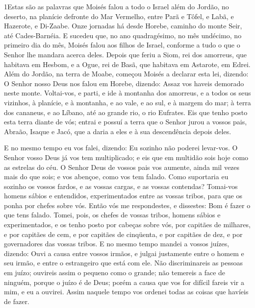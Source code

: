 
\lettrine{1} Estas são as palavras que Moisés falou a todo o
Israel além do Jordão, no deserto, na planície defronte do Mar
Vermelho, entre Parã e Tôfel, e Labã, e Hazerote, e Di-Zaabe.
Onze jornadas há desde Horebe, caminho do monte Seir, até
Cades-Barnéia. E sucedeu que, no ano quadragésimo, no mês
undécimo, no primeiro dia do mês, Moisés falou aos filhos de Israel,
conforme a tudo o que o Senhor lhe mandara acerca deles. Depois
que feriu a Siom, rei dos amorreus, que habitava em Hesbom, e a
Ogue, rei de Basã, que habitava em Astarote, em Edrei. Além do
Jordão, na terra de Moabe, começou Moisés a declarar esta lei,
dizendo: O Senhor nosso Deus nos falou em Horebe, dizendo: Assaz
vos haveis demorado neste monte. Voltai-vos, e parti, e ide à
montanha dos amorreus, e a todos os seus vizinhos, à planície, e à
montanha, e ao vale, e ao sul, e à margem do mar; à terra dos
cananeus, e ao Líbano, até ao grande rio, o rio Eufrates. Eis
que tenho posto esta terra diante de vós; entrai e possuí a terra
que o Senhor jurou a vossos pais, Abraão, Isaque e Jacó, que a daria
a eles e à sua descendência depois deles.

E no mesmo tempo eu vos falei, dizendo: Eu sozinho não poderei
levar-vos. O Senhor vosso Deus já vos tem multiplicado; e eis
que em multidão sois hoje como as estrelas do céu. O Senhor
Deus de vossos pais vos aumente, ainda mil vezes mais do que sois; e
vos abençoe, como vos tem falado. Como suportaria eu sozinho
os vossos fardos, e as vossas cargas, e as vossas contendas?
Tomai-vos homens sábios e entendidos, experimentados entre as
vossas tribos, para que os ponha por chefes sobre vós. Então
vós me respondestes, e dissestes: Bom é fazer o que tens falado.
Tomei, pois, os chefes de vossas tribos, homens sábios e
experimentados, e os tenho posto por cabeças sobre vós, por capitães
de milhares, e por capitães de cem, e por capitães de cinqüenta, e
por capitães de dez, e por governadores das vossas tribos. E
no mesmo tempo mandei a vossos juízes, dizendo: Ouvi a causa entre
vossos irmãos, e julgai justamente entre o homem e seu irmão, e
entre o estrangeiro que está com ele. Não discriminareis as
pessoas em juízo; ouvireis assim o pequeno como o grande; não
temereis a face de ninguém, porque o juízo é de Deus; porém a causa
que vos for difícil fareis vir a mim, e eu a ouvirei. Assim
naquele tempo vos ordenei todas as coisas que havíeis de fazer.

